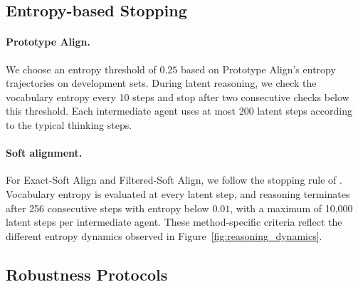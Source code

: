 \documentclass[11pt]{article}
\begin{document}

\subsection{Entropy-based Stopping}
\label{app:latent_step}

\paragraph{Prototype Align.}
We choose an entropy threshold of $0.25$ based on Prototype Align's entropy trajectories on development sets. During latent reasoning, we check the vocabulary entropy every 10 steps and stop after two consecutive checks below this threshold. Each intermediate agent uses at most 200 latent steps according to the typical thinking steps.

\paragraph{Soft alignment.}
For Exact-Soft Align and Filtered-Soft Align, we follow the stopping rule of \citet{soft_thinking}. Vocabulary entropy is evaluated at every latent step, and reasoning terminates after 256 consecutive steps with entropy below $0.01$, with a maximum of 10{,}000 latent steps per intermediate agent. These method-specific criteria reflect the different entropy dynamics observed in Figure~\ref{fig:reasoning_dynamics}.

\subsection{Robustness Protocols}
\end{document}
